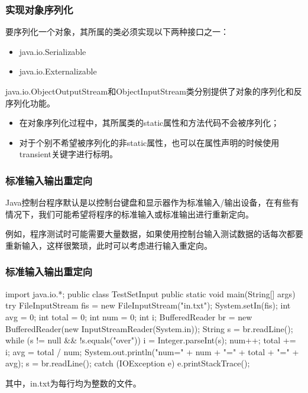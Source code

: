 \begin{frame}[fragile] %
\frametitle{实现对象序列化}

要序列化一个对象，其所属的类必须实现以下两种接口之一：

\begin{itemize}
\item java.io.Serializable
\item java.io.Externalizable
\end{itemize}

java.io.ObjectOutputStream和ObjectInputStream类分别提供了对象的序列化和反序列化功能。


\begin{itemize}\kai
\item 在对象序列化过程中，其所属类的static属性和方法代码不会被序列化；
\item 对于个别不希望被序列化的非static属性，也可以在属性声明的时候使用transient关键字进行标明。
\end{itemize}


\end{frame}

\begin{frame}[fragile] %
\frametitle{标准输入输出重定向}

Java控制台程序默认是以控制台键盘和显示器作为标准输入/输出设备，在有些有情况下，我们可能希望将程序的标准输入或标准输出进行重新定向。

{\kai\Blue 例如，程序测试时可能需要大量数据，如果使用控制台输入测试数据的话每次都要重新输入，这样很繁琐，此时可以考虑进行输入重定向。}
\end{frame}

\begin{frame}[fragile] %
  \frametitle{标准输入输出重定向}
  
  \begin{javaCode}
    import java.io.*;
    public class TestSetInput {
      public static void main(String[] args) {
        try {
          FileInputStream fis = new FileInputStream("in.txt");
          System.setIn(fis);
          int avg = 0;
          int total = 0;
          int num = 0;
          int i;
          BufferedReader br = new BufferedReader(new InputStreamReader(System.in));
          String s = br.readLine();
          while (s != null && !s.equals("over")) {
            i = Integer.parseInt(s);
            num++;
            total += i;
            avg = total / num;
            System.out.println("num=" + num + "\ttotal=" + total + "\tavg=" + avg);
            s = br.readLine();
          }
        } catch (IOException e) {
          e.printStackTrace();
        }
      }
    }
\end{javaCode}
其中，in.txt为每行均为整数的文件。
\end{frame}

